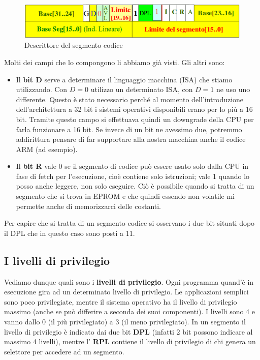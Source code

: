 \documentclass[11pt]{book}
\begin{document}
\begin{figure}[h]
  \centering
  \includegraphics[width=.6\textwidth]{images/descrittorecodice.png}
  \caption{Descrittore del segmento codice}
  \label{descrittore codice}
\end{figure}

Molti dei campi che lo compongono li abbiamo gi\`a visti. Gli altri
sono:

\begin{itemize}
\item Il {\bf bit D} serve a determinare il linguaggio macchina (ISA)
  che stiamo utilizzando. Con $D=0$ utilizzo un determinato ISA, con
  $D=1$ ne uso uno differente. Questo \`e stato necessario perch\'e al
  momento dell'introduzione dell'architettura a 32 bit i sistemi
  operativi disponibili erano per lo pi\`u a 16 bit. Tramite questo
  campo si effettuava quindi un downgrade della CPU per farla
  funzionare a 16 bit. Se invece di un bit ne avessimo due, potremmo
  addirittura pensare di far supportare alla nostra macchina anche il
  codice ARM (ad esempio).

\item Il {\bf bit R} vale 0 se il segmento di codice pu\`o essere
  usato solo dalla CPU in fase di fetch per l'esecuzione, cio\`e
  contiene solo istruzioni; vale 1 quando lo posso anche leggere, non
  solo eseguire. Ci\`o \`e possibile quando si tratta di un segmento
  che si trova in EPROM e che quindi essendo non volatile mi permette
  anche di memorizzarci delle costanti.
\end{itemize}

Per capire che si tratta di un segmento codice si osservano i due bit
situati dopo il DPL che in questo caso sono posti a 11.

\subsection{I livelli di privilegio}

Vediamo dunque quali sono i {\bf livelli di privilegio}. Ogni
programma quand'\`e in esecuzione gira ad un determinato livello di
privilegio. Le applicazioni semplici sono poco privilegiate, mentre il
sistema operativo ha il livello di privilegio massimo (anche se pu\`o
differire a seconda dei suoi componenti). I livelli sono 4 e vanno
dallo 0 (il pi\`u privilegiato) a 3 (il meno privilegiato). In un
segmento il livello di privilegio \`e indicato dai due bit {\bf DPL}
(infatti 2 bit possono indicare al massimo 4 livelli), mentre l'{\bf
  RPL} contiene il livello di privilegio di chi genera un selettore
per accedere ad un segmento.
\end{document}
